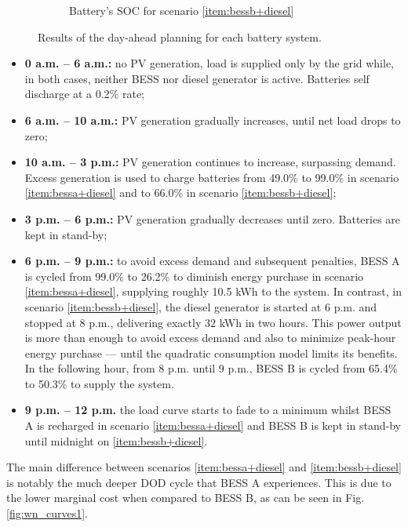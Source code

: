 \documentclass{ieeeaccess}
\begin{document}
\begin{figure}[!h]
\begin{subfigure}{.235\textwidth}
            \caption{Battery's SOC for scenario \ref{item:bessb+diesel}}
            \label{fig:result-soc-B}
        \end{subfigure}
        \caption{Results of the day-ahead planning for each battery system.}
        \label{fig:results}
    \end{figure}

    \begin{itemize}
        \item \textbf{0 a.m. -- 6 a.m.:} no PV generation, load is supplied only by the grid while, in both cases, neither BESS nor diesel generator is active. Batteries self discharge at a 0.2\% rate;
        \item \textbf{6 a.m. -- 10 a.m.:} PV generation gradually increases, until net load drops to zero;
        \item \textbf{10 a.m. -- 3 p.m.:} PV generation continues to increase, surpassing demand. Excess generation is used to charge batteries from 49.0\% to 99.0\% in scenario \ref{item:bessa+diesel} and to 66.0\% in scenario \ref{item:bessb+diesel};
        \item \textbf{3 p.m. -- 6 p.m.:} PV generation gradually decreases until zero. Batteries are kept in stand-by;
        \item \textbf{6 p.m. -- 9 p.m.:} to avoid excess demand and subsequent penalties, BESS A is cycled from 99.0\% to 26.2\% to diminish energy purchase in scenario \ref{item:bessa+diesel}, supplying roughly 10.5 kWh to the system. In contrast, in scenario \ref{item:bessb+diesel}, the diesel generator is started at 6 p.m. and stopped at 8 p.m., delivering exactly 32 kWh in two hours. This power output is more than enough to avoid excess demand and also to minimize peak-hour energy purchase --- until the quadratic consumption model limits its benefits. In the following hour, from 8 p.m. until 9 p.m., BESS B is cycled from 65.4\% to 50.3\% to supply the system.
        \item \textbf{9 p.m. -- 12 p.m.} the load curve starts to fade to a minimum whilst BESS A is recharged in scenario \ref{item:bessa+diesel} and BESS B is kept in stand-by until midnight on \ref{item:bessb+diesel}.
    \end{itemize}

    The main difference between scenarios \ref{item:bessa+diesel} and \ref{item:bessb+diesel} is notably the much deeper DOD cycle that BESS A experiences. This is due to the lower marginal cost when compared to BESS B, as can be seen in Fig. \ref{fig:wn_curves1}.
\end{document}
